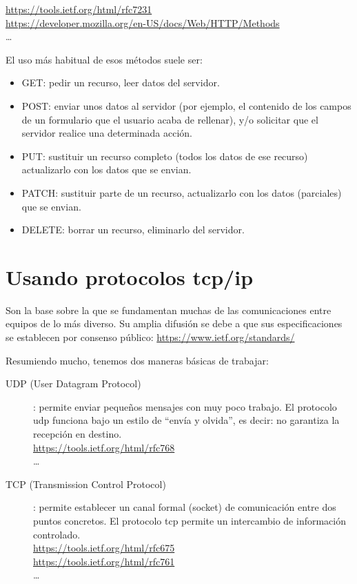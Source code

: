 \documentclass[spanish,12pt,a4paper,final,oneside]{book}
\begin{document}
\url{https://tools.ietf.org/html/rfc7231}
\\ \url{https://developer.mozilla.org/en-US/docs/Web/HTTP/Methods}
\\ \ldots

El uso más habitual de esos métodos suele ser:
\begin{itemize}

\item GET: pedir un recurso, leer datos del servidor.

\item POST: enviar unos datos al servidor (por ejemplo, el contenido de los campos de un formulario que el usuario acaba de rellenar), y/o solicitar que el servidor realice una determinada acción.

\item PUT: sustituir un recurso completo (todos los datos de ese recurso) actualizarlo con los datos que se envian.

\item PATCH: sustituir parte de un recurso, actualizarlo con los datos (parciales) que se envian.

\item DELETE: borrar un recurso, eliminarlo del servidor.

\end{itemize}




\section{Usando protocolos tcp/ip}
Son la base sobre la que se fundamentan muchas de las comunicaciones entre equipos de lo más diverso. Su amplia difusión se debe a que sus especificaciones se establecen por consenso público: \url{https://www.ietf.org/standards/} 

Resumiendo mucho, tenemos dos maneras básicas de trabajar:
\begin{description}
\item[UDP (User Datagram Protocol)]: permite enviar pequeños mensajes con muy poco trabajo. El protocolo udp funciona bajo un estilo de “envía y olvida”, es decir: no garantiza la recepción en destino.
\\ \url{https://tools.ietf.org/html/rfc768}
\\ \ldots
\item[TCP (Transmission Control Protocol)]: permite establecer un canal formal (socket) de comunicación entre dos puntos concretos. El protocolo tcp permite un intercambio de información controlado.
\\ \url{https://tools.ietf.org/html/rfc675}
\\ \url{https://tools.ietf.org/html/rfc761}
\\ \ldots
\end{description}
\end{document}
